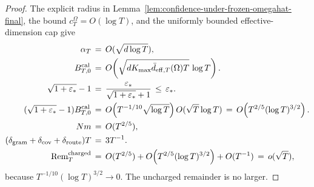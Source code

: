 \documentclass{article} %
\begin{document}
\begin{proof}
The explicit radius in
Lemma~\ref{lem:confidence-under-frozen-omegahat-final}, the bound
\(c_T^\Omega=O(\log T)\), and the uniformly bounded effective-dimension cap
give
\begin{equation}
\begin{aligned}
\alpha_T
&\,=\,
O(\sqrt{d\log T}),
\\
B_{T,0}^{\rm cal}
&\,=\,
O\!\left(
\sqrt{dK_{\max}\bar d_{\mathrm{eff},T}(\Omega)T}\,\log T
\right).
\\
\sqrt{1+\varepsilon_*}-1
&\,=\,
\frac{\varepsilon_*}{\sqrt{1+\varepsilon_*}+1}
\,\leq\,
\varepsilon_*.
\\
(\sqrt{1+\varepsilon_*}-1)B_{T,0}^{\rm cal}
&\,=\,
O\!\left(T^{-1/10}\sqrt{\log T}\right)
O(\sqrt{T}\log T)
\,=\,
O\!\left(T^{2/5}(\log T)^{3/2}\right).
\\
Nm
&\,=\,
O(T^{2/5}),
\\
(\delta_{\rm gram}+\delta_{\rm cov}+\delta_{\rm route})T
&\,=\,
3T^{-1}.
\\
\operatorname{Rem}_T^{\rm charged}
&\,=\,
O(T^{2/5})
+
O\!\left(T^{2/5}(\log T)^{3/2}\right)
+
O(T^{-1})
\,=\,
o(\sqrt T),
\end{aligned}
\end{equation}
because
\(T^{-1/10}(\log T)^{3/2}\to0\). The uncharged remainder is no larger.
\end{proof}
\end{document}

